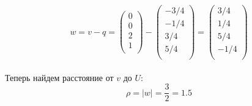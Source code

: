 \documentclass[12pt,a4paper]{scrartcl}
\begin{document}
	 $$w = v - q = \begin{pmatrix}
	 0\\
	 0\\
	 2\\
	 1\\
	 \end{pmatrix} - \begin{pmatrix}
	 -{3}/{4}\\
	 -{1}/{4}\\
	 {3}/{4}\\
	 {5}/{4}\\
	 \end{pmatrix} = \begin{pmatrix}
	 {3}/{4}\\
	 {1}/{4}\\
	 {5}/{4}\\
	 -{1}/{4}\\
	 \end{pmatrix}$$\\
	 Теперь найдем расстояние от $v$ до $U$:\\
	 $$\rho = |w| = \frac{3}{2} = 1.5$$\\
	 
\end{document}
